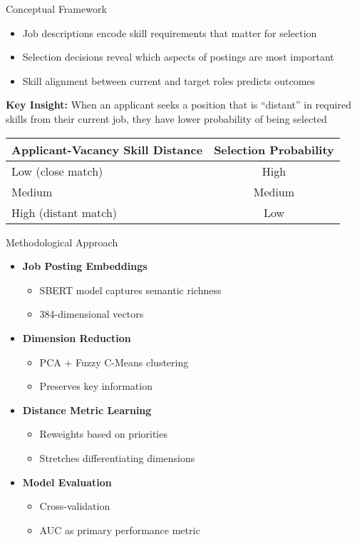 \documentclass{beamer}
\begin{document}
\begin{frame}{Conceptual Framework}
\begin{itemize}
    \item Job descriptions encode skill requirements that matter for selection
    \item Selection decisions reveal which aspects of postings are most important
    \item Skill alignment between current and target roles predicts outcomes
\end{itemize}

\begin{tcolorbox}[colback=boxbackground,colframe=boxframe,sharp corners]
\textbf{Key Insight:} When an applicant seeks a position that is ``distant'' in required skills from their current job, they have lower probability of being selected
\end{tcolorbox}

\begin{table}
\centering
\begin{tabular}{l c}
\toprule
\textbf{Applicant-Vacancy Skill Distance} & \textbf{Selection Probability} \\
\midrule
Low (close match) & High \\
Medium & Medium \\
High (distant match) & Low \\
\bottomrule
\end{tabular}
\end{table}
\end{frame}

\begin{frame}{Methodological Approach}
\begin{itemize}
    \item \textbf{Job Posting Embeddings}
    \begin{itemize}
        \item SBERT model captures semantic richness
        \item 384-dimensional vectors
    \end{itemize}
    \item \textbf{Dimension Reduction}
    \begin{itemize}
        \item PCA + Fuzzy C-Means clustering
        \item Preserves key information
    \end{itemize}
    \item \textbf{Distance Metric Learning}
    \begin{itemize}
        \item Reweights based on priorities
        \item Stretches differentiating dimensions
    \end{itemize}
    \item \textbf{Model Evaluation}
    \begin{itemize}
        \item Cross-validation
        \item AUC as primary performance metric
    \end{itemize}
\end{itemize}
\end{frame}
\end{document}
